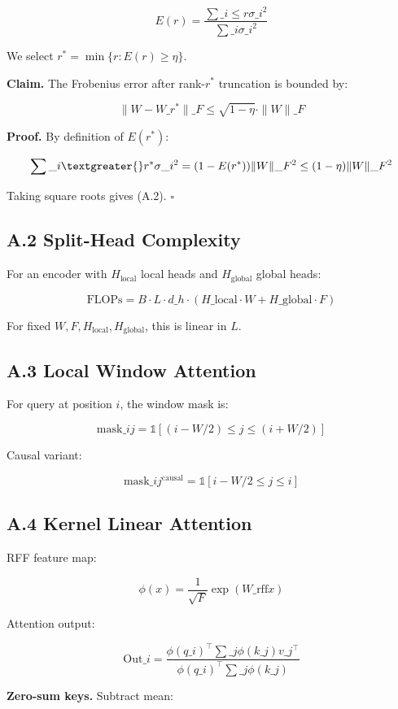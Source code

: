 \[
E(r) = \frac{\sum\_{i \leq r} \sigma\_i^2}{\sum\_{i} \sigma\_i^2}
\]

We select $r^* = \min \{ r : E(r) \geq \eta \}$.

\textbf{Claim.} The Frobenius error after rank-$r^*$ truncation is bounded by:

\[
\|W - W\_{r^*}\|\_F \leq \sqrt{1 - \eta} \cdot \|W\|\_F
\]

\textbf{Proof.} By definition of $E(r^*)$:

\[
\sum\_{i \textgreater{} r^*} \sigma\_i^2 = (1 - E(r^*)) \|W\|\_F^2 \leq (1 - \eta) \|W\|\_F^2
\]

Taking square roots gives (A.2). $\square$

\subsection{A.2 Split-Head Complexity}

For an encoder with $H_\text{local}$ local heads and $H_\text{global}$ 
global heads:

\[
\text{FLOPs} = B \cdot L \cdot d\_h \cdot (H\_\text{local} \cdot W + H\_\text{global} \cdot F)
\]

For fixed $W, F, H_\text{local}, H_\text{global}$, this is linear in $L$.

\subsection{A.3 Local Window Attention}

For query at position $i$, the window mask is:

\[
\text{mask}\_{ij} = \mathbb{1}[(i - W/2) \leq j \leq (i + W/2)]
\]

Causal variant:

\[
\text{mask}\_{ij}^\text{causal} = \mathbb{1}[i - W/2 \leq j \leq i]
\]

\subsection{A.4 Kernel Linear Attention}

RFF feature map:

\[
\phi(x) = \frac{1}{\sqrt{F}} \exp(W\_\text{rff} x)
\]

Attention output:

\[
\text{Out}\_i = \frac{\phi(q\_i)^\top \sum\_j \phi(k\_j) v\_j^\top}{\phi(q\_i)^\top \sum\_j \phi(k\_j)}
\]

\textbf{Zero-sum keys.} Subtract mean:

